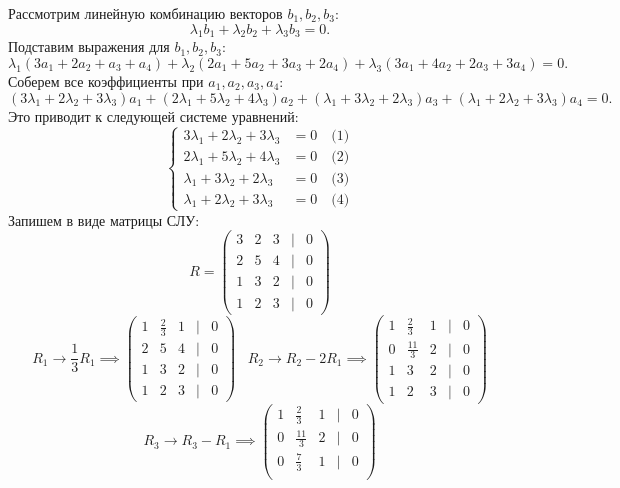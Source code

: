 \documentclass[a4paper]{article}
\newcommand{\case}[1]{\begin{cases} #1 \end{cases}}
\begin{document}
\begin{enumerate}
    Рассмотрим линейную комбинацию векторов $ b_{1}, b_{2}, b_{3} $:
    $$
    \lambda_1 b_{1} + \lambda_2 b_{2} + \lambda_3 b_{3} = 0.
    $$
    Подставим выражения для $ b_{1}, b_{2}, b_{3} $:
    $$
    \lambda_1 (3 a_{1} + 2 a_{2} + a_{3} + a_{4}) + \lambda_2 (2 a_{1} + 5 a_{2} + 3 a_{3} + 2 a_{4}) + \lambda_3 (3 a_{1} + 4 a_{2} + 2 a_{3} + 3 a_{4}) = 0.
    $$
    Соберем все коэффициенты при $ a_{1}, a_{2}, a_{3}, a_{4} $:
    $$
    (3\lambda_1 + 2\lambda_2 + 3\lambda_3) a_{1} + (2\lambda_1 + 5\lambda_2 + 4\lambda_3) a_{2} + (\lambda_1 + 3\lambda_2 + 2\lambda_3) a_{3} + (\lambda_1 + 2\lambda_2 + 3\lambda_3) a_{4} = 0.
    $$
    Это приводит к следующей системе уравнений:
    $$
    \case{
    3\lambda_1 + 2\lambda_2 + 3\lambda_3 &= 0 \quad \text{(1)} \\
    2\lambda_1 + 5\lambda_2 + 4\lambda_3 &= 0 \quad \text{(2)} \\
    \lambda_1 + 3\lambda_2 + 2\lambda_3 &= 0 \quad \text{(3)} \\
    \lambda_1 + 2\lambda_2 + 3\lambda_3 &= 0 \quad \text{(4)}
    }
    $$
    Запишем в виде матрицы СЛУ:
    $$
    R = \begin{pmatrix}
    3 & 2 & 3 & | & 0 \\
    2 & 5 & 4 & | & 0 \\
    1 & 3 & 2 & | & 0 \\
    1 & 2 & 3 & | & 0
    \end{pmatrix}
    $$
    $$
    R_1 \rightarrow \frac{1}{3} R_1 \implies \begin{pmatrix}
    1 & \frac{2}{3} & 1 & | & 0 \\
    2 & 5 & 4 & | & 0 \\
    1 & 3 & 2 & | & 0 \\
    1 & 2 & 3 & | & 0
    \end{pmatrix}\; \; \;
    R_2 \rightarrow R_2 - 2R_1 \implies \begin{pmatrix}
    1 & \frac{2}{3} & 1 & | & 0 \\
    0 & \frac{11}{3} & 2 & | & 0 \\
    1 & 3 & 2 & | & 0 \\
    1 & 2 & 3 & | & 0
    \end{pmatrix}
    $$
    $$
    R_3 \rightarrow R_3 - R_1 \implies \begin{pmatrix}
    1 & \frac{2}{3} & 1 & | & 0 \\
    0 & \frac{11}{3} & 2 & | & 0 \\
    0 & \frac{7}{3} & 1 & | & 0 \\

\end{pmatrix}$$
\end{enumerate}
\end{document}
